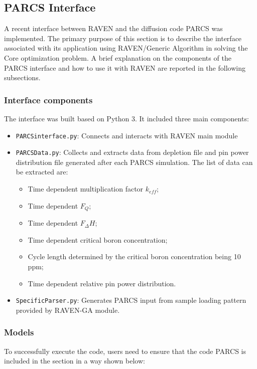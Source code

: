 \subsection{PARCS Interface}
A recent interface between RAVEN and the diffusion code PARCS was implemented.
The primary purpose of this section is to describe the interface associated 
with its application using RAVEN/Generic Algorithm in solving the Core optimization problem.
A brief explanation on the components of the PARCS interface and how to use it with RAVEN 
are reported in the following subsections.

\subsubsection{Interface components}
The interface was built based on Python 3. It included three main components: 
\begin{itemize}

	\item \texttt{PARCSinterface.py}: Connects and interacts with RAVEN main module
	\item \texttt{PARCSData.py}: Collects and extracts data from depletion file and pin power distribution file generated after each PARCS simulation. The list of data can be extracted are:
	\begin{itemize}
  \item Time dependent multiplication factor $k_{eff}$;
	\item Time dependent $F_Q$;
	\item Time dependent $F_\Delta H$;
	\item Time dependent critical boron concentration;
	\item Cycle length determined by the critical boron concentration being 10 ppm;
	\item Time dependent relative pin power distribution.
  \end{itemize}
  \item \texttt{SpecificParser.py}: Generates PARCS input from sample loading pattern provided by RAVEN-GA module. 
\end{itemize}

\subsubsection{Models}
To successfully execute the code, users need to ensure that the code PARCS is included in the 
 section in a way shown below:

